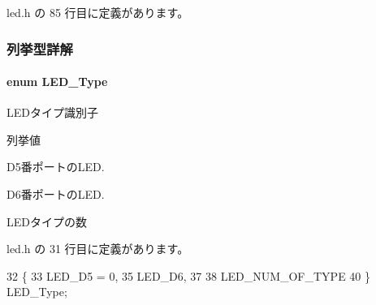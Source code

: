  led.\+h の 85 行目に定義があります。



\subsubsection{列挙型詳解}
\paragraph[{L\+E\+D\+\_\+\+Type}]{\setlength{\rightskip}{0pt plus 5cm}enum {\bf L\+E\+D\+\_\+\+Type}}\label{led_8h_a058b30c4dad8492729144d11afa6ddb1_a058b30c4dad8492729144d11afa6ddb1}


L\+E\+Dタイプ識別子 

\begin{Desc}
\item[列挙値]\par
\begin{description}
\item[{\em 
L\+E\+D\+\_\+\+D5\label{led_8h_a058b30c4dad8492729144d11afa6ddb1_a058b30c4dad8492729144d11afa6ddb1a376e447725418dcb340bfa577b884066}
}]D5番ポートの\+L\+E\+D. \item[{\em 
L\+E\+D\+\_\+\+D6\label{led_8h_a058b30c4dad8492729144d11afa6ddb1_a058b30c4dad8492729144d11afa6ddb1adf13aab65cdf330e59d514c0c1c28496}
}]D6番ポートの\+L\+E\+D. \item[{\em 
L\+E\+D\+\_\+\+N\+U\+M\+\_\+\+O\+F\+\_\+\+T\+Y\+P\+E\label{led_8h_a058b30c4dad8492729144d11afa6ddb1_a058b30c4dad8492729144d11afa6ddb1a6c2579969e8acd0e164f7b6799a4f977}
}]L\+E\+Dタイプの数 \end{description}
\end{Desc}


 led.\+h の 31 行目に定義があります。


\begin{DoxyCode}
32 \{
33     LED_D5 = 0,
35     LED_D6,
37 
38     LED_NUM_OF_TYPE
40 \} LED_Type;
\end{DoxyCode}
